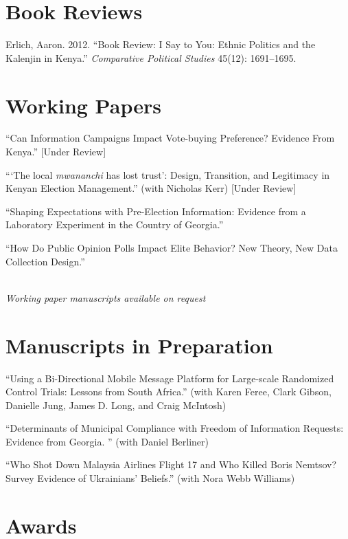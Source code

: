 \documentclass[margin,line]{res}
\begin{document}
{\begin{resume}
\section{\sc Book Reviews}
Erlich, Aaron. 2012. ``Book Review: I Say to You: Ethnic Politics and the Kalenjin in Kenya.'' \emph{Comparative Political Studies} 45(12): 1691--1695.

\section{\sc Working Papers}
``Can Information Campaigns Impact Vote-buying Preference? Evidence
From Kenya.'' [Under Review]

``‘The local \emph{mwananchi} has lost trust’: Design, Transition, and Legitimacy in Kenyan Election Management.'' (with Nicholas Kerr) [Under Review]

``Shaping Expectations with Pre-Election Information:
Evidence from a Laboratory Experiment in the Country of Georgia.''

``How Do Public Opinion Polls Impact Elite Behavior? New Theory, New Data Collection Design.''
\\
\\
\centerline{\emph{Working paper manuscripts available on request}}


\section{\sc Manuscripts in Preparation}
``Using a Bi-Directional Mobile Message Platform for Large-scale
Randomized Control Trials: Lessons from South Africa.'' (with Karen
Feree, Clark Gibson, Danielle
Jung, James D. Long, and Craig McIntosh)

``Determinants of Municipal Compliance with Freedom of Information
Requests: Evidence from Georgia. '' (with Daniel Berliner)

``Who Shot Down Malaysia Airlines Flight 17 and Who Killed Boris Nemtsov?  Survey
Evidence of Ukrainians' Beliefs.'' (with Nora Webb Williams)

\section{\sc Awards} 


\end{resume}}
\end{document}
